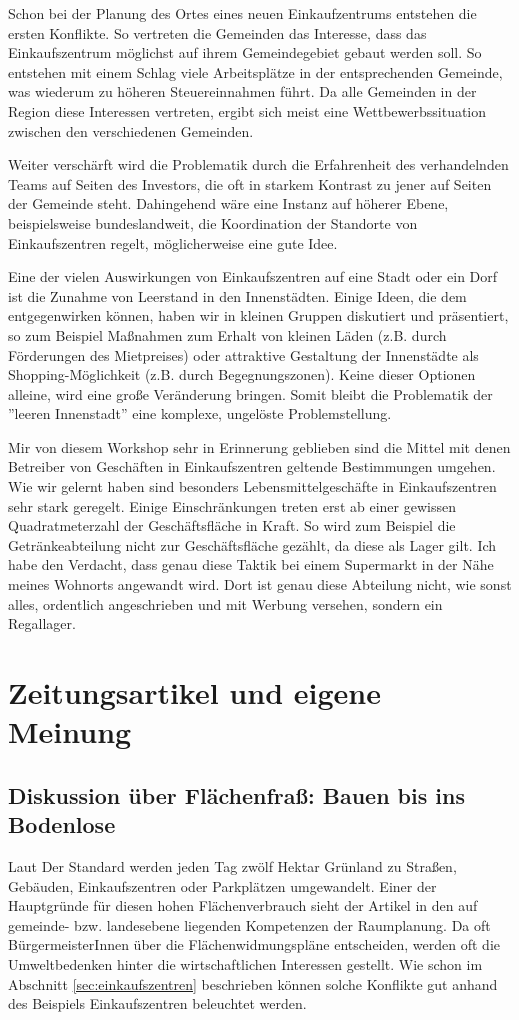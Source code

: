 \documentclass[]{article}
\begin{document}
Schon bei der Planung des Ortes eines neuen Einkaufzentrums entstehen die ersten Konflikte. So vertreten die Gemeinden das Interesse, dass das Einkaufszentrum möglichst auf ihrem Gemeindegebiet gebaut werden soll. So entstehen mit einem Schlag viele Arbeitsplätze in der entsprechenden Gemeinde, was wiederum zu höheren Steuereinnahmen führt. Da alle Gemeinden in der Region diese Interessen vertreten, ergibt sich meist eine Wettbewerbssituation zwischen den verschiedenen Gemeinden.

Weiter verschärft wird die Problematik durch die Erfahrenheit des verhandelnden Teams auf Seiten des Investors, die oft in starkem Kontrast zu jener auf Seiten der Gemeinde steht. Dahingehend wäre eine Instanz auf höherer Ebene, beispielsweise bundeslandweit, die Koordination der Standorte von Einkaufszentren regelt, möglicherweise eine gute Idee.

Eine der vielen Auswirkungen von Einkaufszentren auf eine Stadt oder ein Dorf ist die Zunahme von Leerstand in den Innenstädten. Einige Ideen, die dem entgegenwirken können, haben wir in kleinen Gruppen diskutiert und präsentiert, so zum Beispiel Maßnahmen zum Erhalt von kleinen Läden (z.B. durch Förderungen des Mietpreises) oder attraktive Gestaltung der Innenstädte als Shopping-Möglichkeit (z.B. durch Begegnungszonen). Keine dieser Optionen alleine, wird eine große Veränderung bringen. Somit bleibt die Problematik der ''leeren Innenstadt'' eine komplexe, ungelöste Problemstellung.

Mir von diesem Workshop sehr in Erinnerung geblieben sind die Mittel mit denen Betreiber von Geschäften in Einkaufszentren geltende Bestimmungen umgehen. Wie wir gelernt haben sind besonders Lebensmittelgeschäfte in Einkaufszentren sehr stark geregelt. Einige Einschränkungen treten erst ab einer gewissen Quadratmeterzahl der Geschäftsfläche in Kraft. So wird zum Beispiel die Getränkeabteilung nicht zur Geschäftsfläche gezählt, da diese als Lager gilt. Ich habe den Verdacht, dass genau diese Taktik bei einem Supermarkt in der Nähe meines Wohnorts angewandt wird. Dort ist genau diese Abteilung nicht, wie sonst alles, ordentlich angeschrieben und mit Werbung versehen, sondern ein Regallager.

\section{Zeitungsartikel und eigene Meinung}

\subsection{Diskussion über Flächenfraß: Bauen bis ins Bodenlose}
Laut Der Standard werden jeden Tag zwölf Hektar Grünland zu Straßen, Gebäuden, Einkaufszentren oder Parkplätzen umgewandelt.\cite{bauen_bis_ins_bodenlose} Einer der Hauptgründe für diesen hohen Flächenverbrauch sieht der Artikel in den auf gemeinde- bzw. landesebene liegenden Kompetenzen der Raumplanung. Da oft BürgermeisterInnen über die Flächenwidmungspläne entscheiden, werden oft die Umweltbedenken hinter die wirtschaftlichen Interessen gestellt. Wie schon im Abschnitt \ref{sec:einkaufszentren} beschrieben können solche Konflikte gut anhand des Beispiels Einkaufszentren beleuchtet werden.
\end{document}
